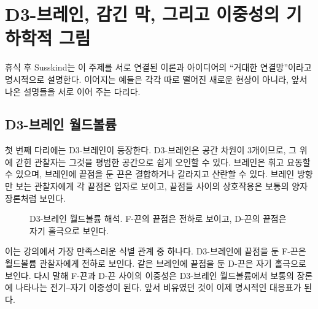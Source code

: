 \section{D3-브레인, 감긴 막, 그리고 이중성의 기하학적 그림}

휴식 후 Susskind는 이 주제를 서로 연결된 이론과 아이디어의 ``거대한 연결망''이라고 명시적으로 설명한다. 이어지는 예들은 각각 따로 떨어진 새로운 현상이 아니라, 앞서 나온 설명들을 서로 이어 주는 다리다.

\subsection{D3-브레인 월드볼륨}

첫 번째 다리에는 D3-브레인이 등장한다. D3-브레인은 공간 차원이 3개이므로, 그 위에 갇힌 관찰자는 그것을 평범한 공간으로 쉽게 오인할 수 있다. 브레인은 휘고 요동할 수 있으며, 브레인에 끝점을 둔 끈은 결합하거나 갈라지고 산란할 수 있다. 브레인 방향만 보는 관찰자에게 각 끝점은 입자로 보이고, 끝점들 사이의 상호작용은 보통의 양자장론처럼 보인다.

\begin{figure}[htbp]
\centering
{}%
\caption{D3-브레인 월드볼륨 해석. F-끈의 끝점은 전하로 보이고, D-끈의 끝점은 자기 홀극으로 보인다.}
\end{figure}

이는 강의에서 가장 만족스러운 식별 관계 중 하나다. D3-브레인에 끝점을 둔 F-끈은 월드볼륨 관찰자에게 전하로 보인다. 같은 브레인에 끝점을 둔 D-끈은 자기 홀극으로 보인다. 다시 말해 F-끈과 D-끈 사이의 이중성은 D3-브레인 월드볼륨에서 보통의 장론에 나타나는 전기--자기 이중성이 된다. 앞서 비유였던 것이 이제 명시적인 대응표가 된다.


